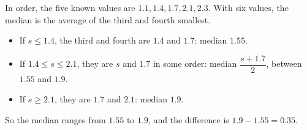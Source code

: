 In order, the five known values are $1.1,1.4,1.7,2.1,2.3$. With six values, the median is the average of the third and fourth smallest.
\begin{itemize}
\item If $s\le1.4$, the third and fourth are $1.4$ and $1.7$: median $1.55$.
\item If $1.4\le s\le2.1$, they are $s$ and $1.7$ in some order: median $\dfrac{s+1.7}{2}$, between $1.55$ and $1.9$.
\item If $s\ge2.1$, they are $1.7$ and $2.1$: median $1.9$.
\end{itemize}
So the median ranges from $1.55$ to $1.9$, and the difference is $1.9-1.55=\boxed{0.35}$.
